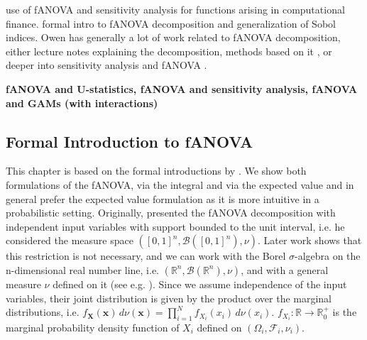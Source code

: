 \cite{liu2006} use of fANOVA and sensitivity analysis for functions arising in computational finance.
\cite{owen2013} formal intro to fANOVA decomposition and generalization of Sobol indices.
Owen has generally a lot of work related to fANOVA decomposition, either lecture notes explaining the decomposition, methods based on it \cite{owen2003}, or deeper into sensitivity analysis and fANOVA \cite{owen2013}.

\textbf{fANOVA and U-statistics, fANOVA and sensitivity analysis, fANOVA and GAMs (with interactions)}

\subsection{Formal Introduction to fANOVA}
This chapter is based on the formal introductions by \cite{rahman2014, sobol1993sensitivity, sobol2001, hooker2004, owen2013, muehlenstaedt2012}. We show both formulations of the fANOVA, via the integral and via the expected value and in general prefer the expected value formulation as it is more intuitive in a probabilistic setting.
Originally, \cite{sobol1993sensitivity} presented the fANOVA decomposition with independent input variables with support bounded to the unit interval, i.e. he considered the measure space $([0, 1]^n, \mathcal{B}([0, 1]^n), \nu)$. Later work shows that this restriction is not necessary, and we can work with the Borel $\sigma$-algebra on the n-dimensional real number line, i.e. $(\mathbb{R}^n, \mathcal{B}(\mathbb{R}^n), \nu)$, and with a general measure $\nu$ defined on it (see e.g. \cite{rahman2014}).
Since we assume independence of the input variables, their joint distribution is given by the product over the marginal distributions, i.e. \(f_{\boldsymbol{X}}(\boldsymbol{x}) \, d\nu(\boldsymbol{x}) = \prod_{i=1}^{N} f_{X_i}(x_i) \, d\nu(x_i)\). \(f_{X_i}: \mathbb{R} \rightarrow \mathbb{R}_{0}^{+}\) is the marginal probability density function of \(X_i\) defined on $(\Omega_i, \mathcal{F}_i, \nu_i)$.



